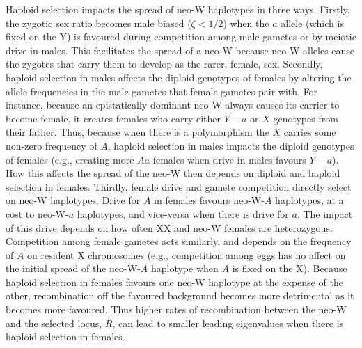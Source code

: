 \documentclass[12pt]{article}
\begin{document}
Haploid selection impacts the spread of neo-W haplotypes in three ways.
Firstly, the zygotic sex ratio becomes male biased ($\zeta<1/2$) when the $a$ allele (which is fixed on the Y) is favoured during competition among male gametes or by meiotic drive in males. 
This facilitates the spread of a neo-W because neo-W alleles cause the zygotes that carry them to develop as the rarer, female, sex. 
Secondly, haploid selection in males affects the diploid genotypes of females by altering the allele frequencies in the male gametes that female gametes pair with.
For instance, because an epistatically dominant neo-W always causes its carrier to become female, it creates females who carry either $Y-a$ or $X$ genotypes from their father.
Thus, because when there is a polymorphism the $X$ carries some non-zero frequency of $A$, haploid selection in males impacts the diploid genotypes of females (e.g., creating more $Aa$ females when drive in males favours $Y-a$).
How this affects the spread of the neo-W then depends on diploid and haploid selection in females.
Thirdly, female drive and gamete competition directly select on neo-W haplotypes.
Drive for $A$ in females favours neo-W-$A$ haplotypes, at a cost to neo-W-$a$ haplotypes, and vice-versa when there is drive for $a$.
The impact of this drive depends on how often XX and neo-W females are heterozygous.
Competition among female gametes acts similarly, and depends on the frequency of $A$ on resident X chromosomes (e.g., competition among eggs has no affect on the initial spread of the neo-W-$A$ haplotype when $A$ is fixed on the X).
Because haploid selection in females favours one neo-W haplotype at the expense of the other, recombination off the favoured background becomes more detrimental as it becomes more favoured. Thus higher rates of recombination between the neo-W and the selected locus, $R$, can lead to smaller leading eigenvalues when there is haploid selection in females.
\end{document}
